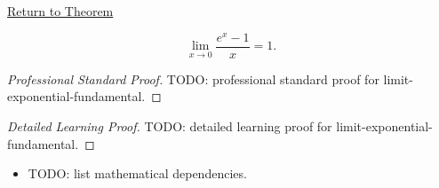 \newpage
{}
\label{prf:limit-exponential-fundamental}

\begin{remark*}[Return]
\hyperref[prop:limit-exponential-fundamental]{Return to Theorem}
\end{remark*}

\begin{proposition*}
\[
  \lim_{x \to 0} \frac{e^x - 1}{x} = 1.
\]

\smallskip\noindent
\end{proposition*}

\begin{proof}[Professional Standard Proof]
\LRAProofBodyStart
TODO: professional standard proof for limit-exponential-fundamental.
\end{proof}

\begin{proof}[Detailed Learning Proof]
\LRAProofBodyStart
TODO: detailed learning proof for limit-exponential-fundamental.
\end{proof}

\begin{remark*}
\end{remark*}

\begin{dependencies}
\begin{itemize}
  \item TODO: list mathematical dependencies.
\end{itemize}
\end{dependencies}

\clearpage
